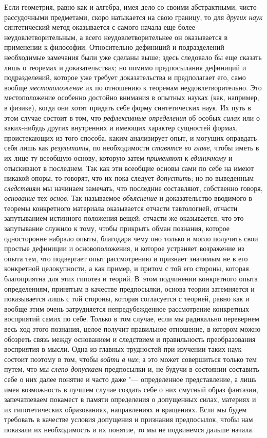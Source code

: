 Если геометрия, равно как и алгебра, имея дело со своими
абстрактными, чисто рассудочными предметами, скоро натыкается на свою
границу, то для {\em других наук}
синтетический метод оказывается с самого начала еще более
неудовлетворительным, а всего неудовлетворительнее он оказывается в
применении к философии. Относительно дефиниций и подразделений необходимые
замечания были уже сделаны выше; здесь следовало бы еще сказать лишь о
теоремах и доказательствах; но помимо предпосылания дефиниций и
подразделений, которое уже требует доказательства и предполагает его, само
вообще {\em местоположение}
их по отношению к теоремам неудовлетворительно. Это
местоположение особенно достойно внимания в опытных науках (как, например,
в физике), когда они хотят придать себе форму синтетических наук. Их путь в
этом случае состоит в том, что
{\em рефлексивные определения}
об особых {\em силах}
или о каких-нибудь других внутренних и имеющих характер
сущностей формах, проистекающих из того способа, каким анализирует опыт, и
могущих оправдать себя лишь как
{\em результаты}, по
необходимости {\em ставятся во главе},
чтобы иметь в их лице ту всеобщую основу, которую затем
{\em применяют} к
{\em единичному} и
отыскивают в последнем. Так как эти всеобщие основы сами по себе на имеют
никакой опоры, то говорят, что их пока следует
{\em допустить}; но по
выведенным {\em следствиям}
мы начинаем замечать, что последние составляют,
собственно говоря,
{\em основание} тех
{\em основ}. Так
называемое {\em объяснение}
и доказательство вводимого в теоремы конкретного материала
оказывается отчасти тавтологией, отчасти запутыванием истинного положения
вещей; отчасти же оказывается, что это запутывание служило к тому, чтобы
прикрыть обман познания, которое односторонне набрало опыты, благодаря чему
оно только и могло получить свои простые дефиниции и основоположения, и
которое устраняет возражение из опыта тем, что подвергает опыт рассмотрению
и признает значимым не в его конкретной целокупности, а как пример, и
притом с той его стороны, которая благоприятна для этих гипотез и теорий.
В~этом подчинении конкретного опыта определениям, принятым в качестве
предпосылки, основа теории затемняется и показывается лишь с той стороны,
которая согласуется с теорией, равно как и вообще этим очень затрудняется
непредубежденное рассмотрение конкретных восприятий самих по себе. Только в
том случае, если мы радикально перевернем весь ход этого познания, целое
получит правильное отношение, в котором можно обозреть связь между
основанием и следствием и правильность преобразования восприятия в мысли.
Одна из главных трудностей при изучении таких наук состоит поэтому в том,
чтобы {\em войти в них};
а это может совершиться только тем путем, что мы
{\em слепо допускаем}
предпосылки и, не будучи в состоянии составить себе о них
далее понятие и часто даже "--- определенное представление, а
лишь имея возможность в лучшем случае создать себе о них смутный образ
фантазии, запечатлеваем покамест в памяти определения о допущенных силах,
материях и их гипотетических образованиях, направлениях и вращениях. Если
мы будем требовать в качестве условия допущения и признания предпосылок,
чтобы нам показали их необходимость и их понятие, то мы не подвинемся
дальше начала.

